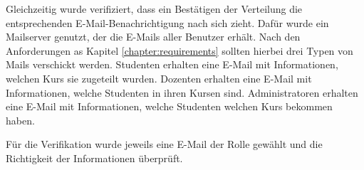 			Gleichzeitig wurde verifiziert, dass ein Bestätigen der Verteilung die entsprechenden E-Mail-Benachrichtigung nach sich zieht.
			Dafür wurde ein Mailserver genutzt, der die E-Mails aller Benutzer erhält.
			Nach den Anforderungen as Kapitel \ref{chapter:requirements} sollten hierbei drei Typen von Mails verschickt werden.
			Studenten erhalten eine E-Mail mit Informationen, welchen Kurs sie zugeteilt wurden.
			Dozenten erhalten eine E-Mail mit Informationen, welche Studenten in ihren Kursen sind.
			Administratoren erhalten eine E-Mail mit Informationen, welche Studenten welchen Kurs bekommen haben.
            
			Für die Verifikation wurde jeweils eine E-Mail der Rolle gewählt und die Richtigkeit der Informationen überprüft.	

